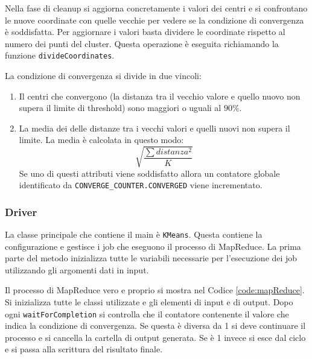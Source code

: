 \documentclass[10pt,twocolumn,letterpaper]{article}
\newcommand{\code}[1]{\texttt{#1}}
\begin{document}
        Nella fase di cleanup si aggiorna concretamente i valori dei centri e
        si confrontano le nuove coordinate con quelle vecchie per vedere se
        la condizione di convergenza è soddisfatta.
        Per aggiornare i valori basta dividere le coordinate rispetto
        al numero dei punti del cluster. Questa operazione è eseguita
        richiamando la funzione \code{divideCoordinates}.

        La condizione di convergenza si divide in due vincoli:
        \begin{enumerate}
            \item Il centri che convergono (la distanza tra il vecchio
                valore e quello nuovo non supera il limite di threshold) sono maggiori o
                uguali al $90\%$.
            \item La media dei delle distanze tra i vecchi valori e quelli nuovi
                non supera il limite. La media è calcolata in questo modo:
                $$\sqrt{\frac{\sum{distanza^2}}{K}}$$
        Se uno di questi attributi viene soddisfatto allora un contatore globale identificato
        da \code{CONVERGE\_COUNTER.CONVERGED} viene incrementato.
        \end{enumerate}

        
    \subsubsection{Driver}
    \label{driver}
        La classe principale che contiene il main è \code{KMeans}. Questa contiene
        la configurazione e gestisce i job che eseguono il processo di MapReduce.
        La prima parte del metodo inizializza tutte le variabili necessarie
        per l'esecuzione dei job utilizzando gli argomenti dati in input.

        

        Il processo di MapReduce vero e proprio si mostra nel Codice \ref{code:mapReduce}.
        Si inizializza tutte le classi utilizzate e gli elementi di
        input e di output. Dopo ogni \code{waitForCompletion} si controlla che
        il contatore contenente il valore che indica la condizione di convergenza.
        Se questa è diversa da 1 si deve continuare il processo e si cancella
        la cartella di output generata. Se è 1 invece si esce dal ciclo e si passa
        alla scrittura del risultato finale.
\end{document}
